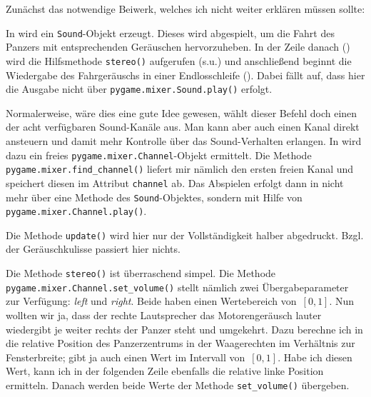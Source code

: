 Zunächst das notwendige Beiwerk, welches ich nicht weiter erklären müssen sollte:


In  wird ein \texttt{Sound}-Objekt erzeugt. Dieses wird abgespielt, um die Fahrt des Panzers mit entsprechenden Geräuschen hervorzuheben. In der Zeile danach () wird die Hilfsmethode \texttt{stereo()} aufgerufen (s.u.) und anschließend beginnt die Wiedergabe des Fahrgeräuschs in einer Endlosschleife (). Dabei fällt auf, dass hier die Ausgabe nicht über \texttt{pygame.mixer.Sound.play()} erfolgt. 

Normalerweise, wäre dies eine gute Idee gewesen, wählt dieser Befehl doch einen der acht verfügbaren Sound-Kanäle aus. Man kann aber auch einen Kanal direkt ansteuern und damit mehr Kontrolle über das Sound-Verhalten erlangen. In  wird dazu ein freies  \texttt{pygame.mixer.Channel}-Objekt ermittelt. Die Methode \texttt{pygame.mixer.find\-\_chan\-nel()}  liefert mir nämlich den ersten freien Kanal und speichert diesen im Attribut \texttt{channel} ab. Das Abspielen erfolgt dann in  nicht mehr über eine Methode des \texttt{Sound}-Objektes, sondern mit Hilfe von \texttt{pygame.mixer.Channel.play()}. 


Die Methode \texttt{update()} wird hier nur der Vollständigkeit halber abgedruckt. Bzgl. der Geräuschkulisse passiert hier nichts. 


Die Methode \texttt{stereo()} ist überraschend simpel. Die Methode \texttt{pygame.mixer.Channel\-.set\-\_vol\-ume()} stellt nämlich zwei Übergabeparameter zur Verfügung: \emph{left} und \emph{right}. Beide haben einen Wertebereich von~$[0, 1]$. Nun wollten wir ja, dass der rechte Lautsprecher das Motorengeräusch lauter wiedergibt je weiter rechts der Panzer steht und umgekehrt. Dazu berechne ich in  die relative Position des Panzerzentrums in der Waagerechten im Verhältnis zur Fensterbreite; gibt ja auch einen Wert im Intervall von~$[0, 1]$. Habe ich diesen Wert, kann ich in der folgenden Zeile ebenfalls die relative linke Position ermitteln. Danach werden beide Werte der Methode \texttt{set\_volume()} übergeben. 

